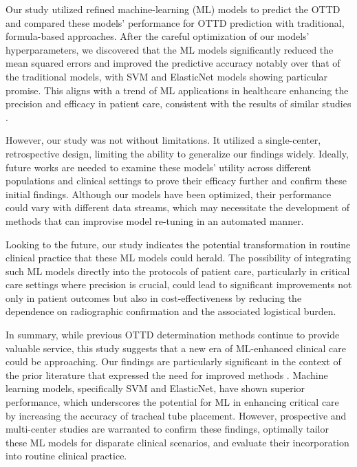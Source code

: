 \documentclass[11pt]{article}
\begin{document}
Our study utilized refined machine-learning (ML) models to predict the OTTD and compared these models' performance for OTTD prediction with traditional, formula-based approaches. After the careful optimization of our models' hyperparameters, we discovered that the ML models significantly reduced the mean squared errors and improved the predictive accuracy notably over that of the traditional models, with SVM and ElasticNet models showing particular promise. This aligns with a trend of ML applications in healthcare enhancing the precision and efficacy in patient care, consistent with the results of similar studies \cite{Xia2022DevelopmentAV}. 

However, our study was not without limitations. It utilized a single-center, retrospective design, limiting the ability to generalize our findings widely. Ideally, future works are needed to examine these models' utility across different populations and clinical settings to prove their efficacy further and confirm these initial findings. Although our models have been optimized, their performance could vary with different data streams, which may necessitate the development of methods that can improvise model re-tuning in an automated manner.

Looking to the future, our study indicates the potential transformation in routine clinical practice that these ML models could herald. The possibility of integrating such ML models directly into the protocols of patient care, particularly in critical care settings where precision is crucial, could lead to significant improvements not only in patient outcomes but also in cost-effectiveness by reducing the dependence on radiographic confirmation and the associated logistical burden.

In summary, while previous OTTD determination methods continue to provide valuable service, this study suggests that a new era of ML-enhanced clinical care could be approaching. Our findings are particularly significant in the context of the prior literature that expressed the need for improved methods \cite{Xia2022DevelopmentAV}. Machine learning models, specifically SVM and ElasticNet, have shown superior performance, which underscores the potential for ML in enhancing critical care by increasing the accuracy of tracheal tube placement. However, prospective and multi-center studies are warranted to confirm these findings, optimally tailor these ML models for disparate clinical scenarios, and evaluate their incorporation into routine clinical practice.
\end{document}
